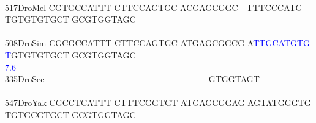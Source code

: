 \documentclass[11pt,twoside,reqno,a4paper]{article}
\begin{document}
{\\
517\hspace*{2\charwidth}DroMel	CGTGCCATTT	CTTCCAGTGC	ACGAGCGGC-	-TTTCCCATG	TGTGTGTGCT	GCGTGGTAGC	\\
\hspace*{5\charwidth}\hspace*{7\charwidth}\hspace*{1\charwidth}\hspace*{1\charwidth}\hspace*{1\charwidth}\hspace*{1\charwidth}\hspace*{1\charwidth}\hspace*{1\charwidth}\\
508\hspace*{2\charwidth}DroSim	CGCGCCATTT	CTTCCAGTGC	ATGAGCGGCG	A\textcolor{Blue}{T}\textcolor{Blue}{T}\textcolor{Blue}{G}\textcolor{Blue}{C}\textcolor{Blue}{A}\textcolor{Blue}{T}\textcolor{Blue}{G}\textcolor{Blue}{T}\textcolor{Blue}{G}	\textcolor{Blue}{T}GTGTGTGCT	GCGTGGTAGC	\\
\hspace*{5\charwidth}\hspace*{7\charwidth}\hspace*{1\charwidth}\hspace*{1\charwidth}\hspace*{1\charwidth}\hspace*{31\charwidth}\textcolor{Blue}{7.6}\hspace*{1\charwidth}\hspace*{1\charwidth}\hspace*{1\charwidth}\\
335\hspace*{2\charwidth}DroSec	----------	----------	----------	----------	----------	--GTGGTAGT	\\
\hspace*{5\charwidth}\hspace*{7\charwidth}\hspace*{1\charwidth}\hspace*{1\charwidth}\hspace*{1\charwidth}\hspace*{1\charwidth}\hspace*{1\charwidth}\hspace*{1\charwidth}\\
547\hspace*{2\charwidth}DroYak	CGCCTCATTT	CTTTCGGTGT	ATGAGCGGAG	AGTATGGGTG	TGTGCGTGCT	GCGTGGTAGC	\\
}
\end{document}
